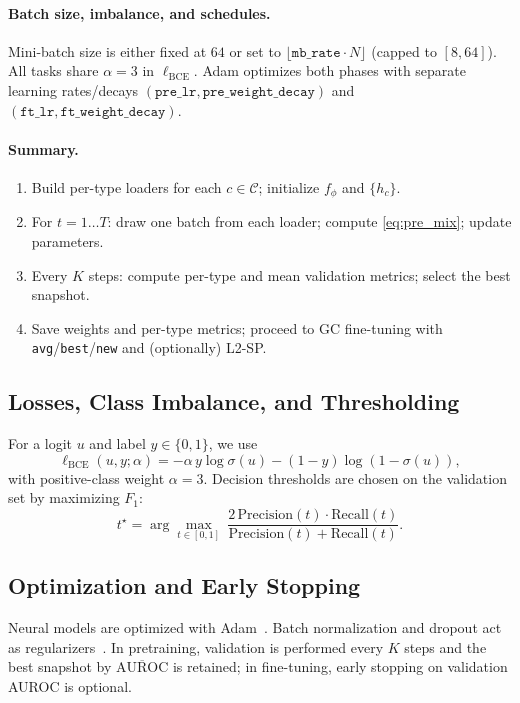 \documentclass[journal,article,submit,pdftex,moreauthors]{Definitions/mdpi}
\begin{document}
\paragraph{Batch size, imbalance, and schedules.}
Mini-batch size is either fixed at $64$ or set to $\lfloor \texttt{mb\_rate}\cdot N\rfloor$ (capped to $[8,64]$). All tasks share $\alpha{=}3$ in $\ell_{\mathrm{BCE}}$. Adam optimizes both phases with separate learning rates/decays $(\texttt{pre\_lr},\texttt{pre\_weight\_decay})$ and $(\texttt{ft\_lr},\texttt{ft\_weight\_decay})$.

\paragraph{Summary.}
\begin{enumerate}[topsep=0pt,itemsep=1pt,leftmargin=12pt]
\item Build per-type loaders for each $c\in\mathcal{C}$; initialize $f_\phi$ and $\{h_c\}$.
\item For $t=1\ldots T$: draw one batch from each loader; compute \eqref{eq:pre_mix}; update parameters.
\item Every $K$ steps: compute per-type and mean validation metrics; select the best snapshot.
\item Save weights and per-type metrics; proceed to GC fine-tuning with \texttt{avg}/\texttt{best}/\texttt{new} and (optionally) L2-SP.
\end{enumerate}

\subsection{Losses, Class Imbalance, and Thresholding}
For a logit $u$ and label $y\in\{0,1\}$, we use
\begin{equation}
\ell_{\mathrm{BCE}}(u,y;\alpha)=-\alpha\,y\log\sigma(u)-(1-y)\log(1-\sigma(u)),
\end{equation}
with positive-class weight $\alpha{=}3$. Decision thresholds are chosen on the validation set by maximizing $F_1$:
\begin{equation}
t^\star=\arg\max_{t\in[0,1]}\ \frac{2\,\mathrm{Precision}(t)\cdot\mathrm{Recall}(t)}{\mathrm{Precision}(t)+\mathrm{Recall}(t)}.
\end{equation}

\subsection{Optimization and Early Stopping}
Neural models are optimized with Adam~\citep{Kingma2015_Adam}. Batch normalization and dropout act as regularizers~\citep{Ioffe2015_BN,Srivastava2014_Dropout}. In pretraining, validation is performed every $K$ steps and the best snapshot by $\overline{\mathrm{AUROC}}$ is retained; in fine-tuning, early stopping on validation AUROC is optional.
\end{document}
